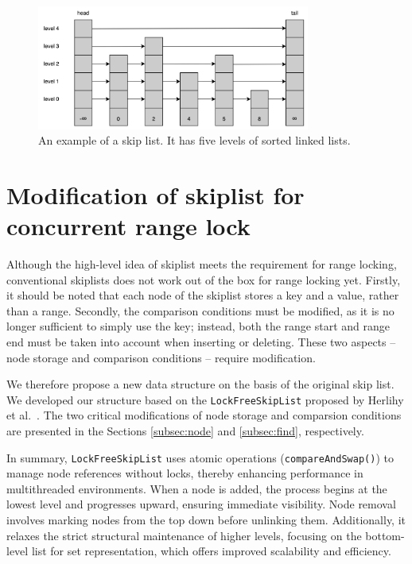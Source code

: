 \begin{figure}[h!]
    \centering
    \includegraphics[width=0.8\textwidth]{./figures/skiplist.png}
    \caption{An example of a skip list. It has five levels of sorted linked lists.}
    \label{fig:skiplist}
\end{figure}

\section{Modification of skiplist for concurrent range lock}

Although the high-level idea of skiplist meets the requirement for range locking, conventional skiplists does not work out of the box for range locking yet. 
Firstly, it should be noted that each node of the skiplist stores a key and a value, rather than a range. 
Secondly, the comparison conditions must be modified, as it is no longer sufficient to simply use the key; instead, both the range start and range end must be taken into account when inserting or deleting. 
These two aspects -- node storage and comparison conditions -- require modification.

We therefore propose a new data structure on the basis of the original skip list.
We developed our structure based on the \texttt{LockFreeSkipList} proposed by Herlihy et al.~\parencite{herlihy2020art}. 
The two critical modifications of node storage and comparsion conditions are presented in the Sections \ref{subsec:node} and \ref{subsec:find}, respectively.

In summary, \texttt{LockFreeSkipList} uses atomic operations (\texttt{compareAndSwap()}) to manage node references without locks, thereby enhancing performance in multithreaded environments.
When a node is added, the process begins at the lowest level and progresses upward, ensuring immediate visibility. 
Node removal involves marking nodes from the top down before unlinking them. 
Additionally, it relaxes the strict structural maintenance of higher levels, focusing on the bottom-level list for set representation, which offers improved scalability and efficiency.

